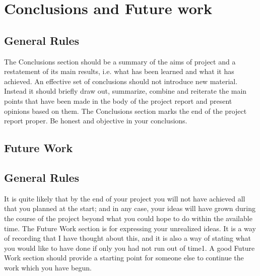 \chapter{Conclusions and Future work}



\section{General Rules}
The Conclusions section should be a summary of the aims of project and a restatement of its
main results, i.e. what has been learned and what it has achieved. An effective set of
conclusions should not introduce new material. Instead it should briefly draw out, summarize,
combine and reiterate the main points that have been made in the body of the project report
and present opinions based on them.
The Conclusions section marks the end of the project report proper. Be honest and objective
in your conclusions.

\section{Future Work}

\section{General Rules}

It is quite likely that by the end of your project you will not have achieved all that you
planned at the start; and in any case, your ideas will have grown during the course of the
project beyond what you could hope to do within the available time. The Future Work section
is for expressing your unrealized ideas. It is a way of recording that I have thought about
this, and it is also a way of stating what you would like to have done if only you had not run
out of time1. A good Future Work section should provide a starting point for someone else to
continue the work which you have begun.

